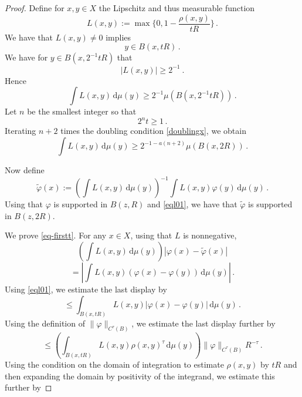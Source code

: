 \begin{proof}
    Define for $x,y\in X$ the Lipschitz and thus measurable function
    \begin{equation}
        L(x,y) := \max\{0, 1 - \frac{\rho(x,y)}{tR}\}\, .
    \end{equation}
We have that $L(x,y)\neq 0$ implies
\begin{equation}\label{eql01}
    y\in B(x, tR)\, .
\end{equation}
We have for $y\in B(x, 2^{-1}tR)$ that
\begin{equation}\label{eql30}
    |L(x,y)|\ge 2^{-1} \ .
\end{equation}
Hence
\begin{equation}
    \int L(x,y) \, \mathrm{d}\mu(y)\ge 2^{-1}\mu(B(x, 2^{-1}tR))\, .
\end{equation}
 Let $n$ be the smallest integer so that
 \begin{equation}\label{2nt1}
    2^n t\ge 1\, .
 \end{equation}
 Iterating $n+2$ times the doubling condition \eqref{doublingx}, we obtain
 \begin{equation}\label{eql32}
    \int L(x,y) \, \mathrm{d}\mu(y)\ge 2^{-1-a(n+2)}\mu(B(x, 2R))\, .
 \end{equation}

Now define
    $$
        \tilde \varphi(x) := \left(\int L(x,y) \, \mathrm{d}\mu(y)\right)^{-1}\int L(x,y) \varphi(y) \, \mathrm{d}\mu(y)\, .
    $$
Using that $\varphi$ is supported in $B(z,R)$ and
\eqref{eql01}, we have that $\tilde{\varphi}$ is supported in $B(z,2R)$.

We prove \eqref{eq-firstt}.
 For any $x\in X$, using that $L$ is nonnegative,
   \begin{equation}\label{eql1}
    \left(\int L(x,y) \, \mathrm{d}\mu(y)\right)
        |\varphi(x) - \tilde \varphi(x)|
    \end{equation}
 \begin{equation}\label{eql2}
 = \left| \int L(x,y)(\varphi(x) - \varphi(y)) \, \mathrm{d}\mu(y)\right|\, .
    \end{equation}
Using \eqref{eql01}, we estimate the last display by
 \begin{equation}\label{eql3}
         \le \int_{B(x, tR)} L(x,y)|\varphi(x) - \varphi(y)| \, \mathrm{d}\mu(y)\, .\end{equation}
  Using the definition of $\|\varphi\|_{C^\tau(B)}$, we estimate the last display further by
       \begin{equation}\label{eql4}
         \le \left(\int_{B(x, tR)} L(x,y)
          \rho(x,y)^\tau \, \mathrm{d}\mu(y) \right)\|\varphi\|_{C^\tau(B)}R^{-\tau}\, .
    \end{equation}
  Using the condition on the domain of integration to estimate $\rho(x,y)$ by $tR$ and then expanding the domain by positivity of the integrand, we estimate this further by


\end{proof}
